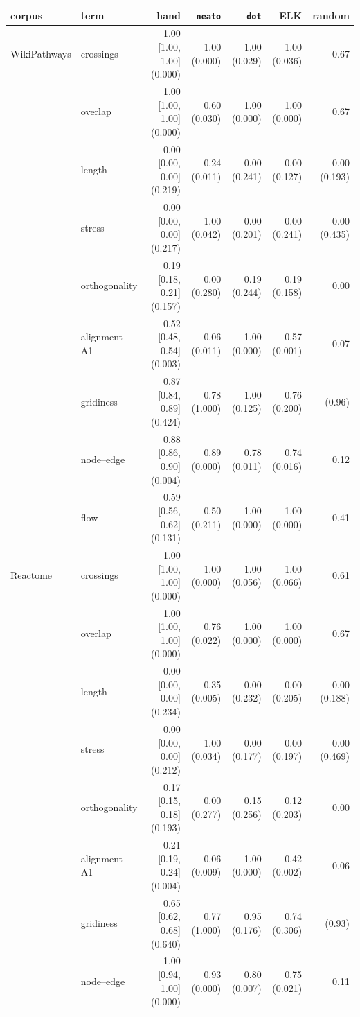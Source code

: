\documentclass[11pt]{article}
\begin{document}
\begin{table}[!t]\centering\scriptsize\setlength{\tabcolsep}{3.5pt}
\begin{tabular}{llrrrrr}
\toprule
corpus & term & hand & \texttt{neato} & \texttt{dot} & ELK & random \\
\midrule
WikiPathways & crossings & 1.00 [1.00, 1.00] (0.000) & 1.00 (0.000) & 1.00 (0.029) & 1.00 (0.036) & 0.67 \\
& overlap & 1.00 [1.00, 1.00] (0.000) & 0.60 (0.030) & 1.00 (0.000) & 1.00 (0.000) & 0.67 \\
& length & 0.00 [0.00, 0.00] (0.219) & 0.24 (0.011) & 0.00 (0.241) & 0.00 (0.127) & 0.00 (0.193) \\
& stress & 0.00 [0.00, 0.00] (0.217) & 1.00 (0.042) & 0.00 (0.201) & 0.00 (0.241) & 0.00 (0.435) \\
& orthogonality & 0.19 [0.18, 0.21] (0.157) & 0.00 (0.280) & 0.19 (0.244) & 0.19 (0.158) & 0.00 \\
& alignment A1 & 0.52 [0.48, 0.54] (0.003) & 0.06 (0.011) & 1.00 (0.000) & 0.57 (0.001) & 0.07 \\
& gridiness & 0.87 [0.84, 0.89] (0.424) & 0.78 (1.000) & 1.00 (0.125) & 0.76 (0.200) & (0.96) \\
& node--edge & 0.88 [0.86, 0.90] (0.004) & 0.89 (0.000) & 0.78 (0.011) & 0.74 (0.016) & 0.12 \\
& flow & 0.59 [0.56, 0.62] (0.131) & 0.50 (0.211) & 1.00 (0.000) & 1.00 (0.000) & 0.41 \\
\midrule
Reactome & crossings & 1.00 [1.00, 1.00] (0.000) & 1.00 (0.000) & 1.00 (0.056) & 1.00 (0.066) & 0.61 \\
& overlap & 1.00 [1.00, 1.00] (0.000) & 0.76 (0.022) & 1.00 (0.000) & 1.00 (0.000) & 0.67 \\
& length & 0.00 [0.00, 0.00] (0.234) & 0.35 (0.005) & 0.00 (0.232) & 0.00 (0.205) & 0.00 (0.188) \\
& stress & 0.00 [0.00, 0.00] (0.212) & 1.00 (0.034) & 0.00 (0.177) & 0.00 (0.197) & 0.00 (0.469) \\
& orthogonality & 0.17 [0.15, 0.18] (0.193) & 0.00 (0.277) & 0.15 (0.256) & 0.12 (0.203) & 0.00 \\
& alignment A1 & 0.21 [0.19, 0.24] (0.004) & 0.06 (0.009) & 1.00 (0.000) & 0.42 (0.002) & 0.06 \\
& gridiness & 0.65 [0.62, 0.68] (0.640) & 0.77 (1.000) & 0.95 (0.176) & 0.74 (0.306) & (0.93) \\
& node--edge & 1.00 [0.94, 1.00] (0.000) & 0.93 (0.000) & 0.80 (0.007) & 0.75 (0.021) & 0.11 \\

\end{tabular}
\end{table}
\end{document}
